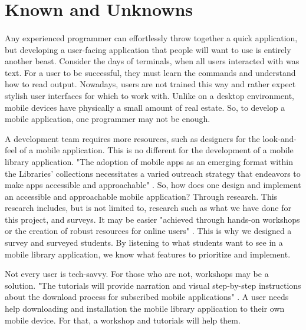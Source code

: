     
   

\section{Known and Unknowns}

    \paragraph{}
    Any experienced programmer can effortlessly throw together a quick application, but developing a user-facing application that people will want to use is entirely another beast. Consider the days of terminals, when all users interacted with was text. For a user to be successful, they must learn the commands and understand how to read output. Nowadays, users are not trained this way and rather expect stylish user interfaces for which to work with. Unlike on a desktop environment, mobile devices have physically a small amount of real estate. So, to develop a mobile application, one programmer may not be enough.
    
    A development team requires more resources, such as designers for the look-and-feel of a mobile application. This is no different for the development of a mobile library application. "The adoption of mobile apps as an emerging format within the Libraries’ collections necessitates a varied outreach strategy that endeavors to make apps accessible and approachable" \cite{saragossi_costello_kasten_2018}. So, how does one design and implement an accessible and approachable mobile application? Through research. This research includes, but is not limited to, research such as what we have done for this project, and surveys. It may be easier "achieved through hands-on workshops or the creation of robust resources for online users" \cite{saragossi_costello_kasten_2018}. This is why we designed a survey and surveyed students. By listening to what students want to see in a mobile library application, we know what features to prioritize and implement.
    
    Not every user is tech-savvy. For those who are not, workshops may be a solution. "The tutorials will provide narration and visual step-by-step instructions about the download process for subscribed mobile applications" \cite{saragossi_costello_kasten_2018}. A user needs help downloading and installation the mobile library application to their own mobile device. For that, a workshop and tutorials will help them.

